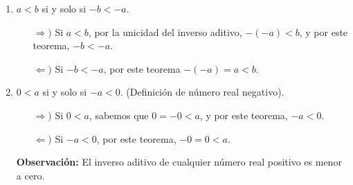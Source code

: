 \documentclass[11pt]{article}
\begin{document}
\begin{enumerate}[label=\alph*)]
\begin{enumerate}[label=\roman*)]
        \item $a<b$ si y solo si $-b<-a$.
        \begin{itemize}
            \item[$\Rightarrow)$] Si $a<b$, por la unicidad del inverso aditivo, $-(-a) < b$, y por este teorema, $-b<-a$.
            \item[$\Leftarrow)$] Si $-b<-a$, por este teorema $-(-a)=a<b$. \qedhere
        \end{itemize}
    
        \item $0<a$ si y solo si $-a<0$. (Definición de número real negativo).
        \begin{itemize}
            \item[$\Rightarrow)$] Si $0<a$, sabemos que $0=-0<a$, y por este teorema, $-a<0$.
            \item[$\Leftarrow)$] Si $-a<0$, por este teorema, $-0=0<a$. \qedhere
        \end{itemize}
        \textbf{Observación:} El inverso aditivo de cualquier número real positivo es menor a cero.


\end{enumerate}
\end{enumerate}
\end{document}
